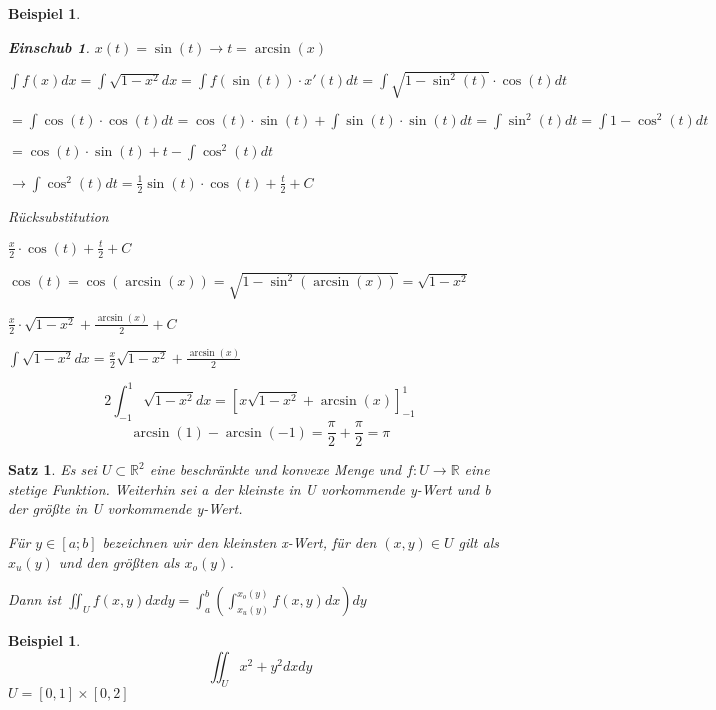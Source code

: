 \documentclass[12pt,a4paper]{scrreprt}
\newtheorem{beispiel}[defi]{Beispiel}
\newtheorem{satz}[defi]{Satz}
\newtheorem*{einschub}{Einschub}
\begin{document}
\begin{beispiel}
\begin{enumerate}[label=\emph{(\roman*)}]
\begin{einschub}
			$x(t)=\sin(t) \to t=\arcsin(x)$

			$\int f(x)dx=\int \sqrt{1-x^2}dx=\int f(\sin(t))\cdot x'(t)dt=\int \sqrt{1-\sin^2(t)}\cdot\cos(t)dt$

			$=\int \cos(t)\cdot\cos(t)dt=\cos(t)\cdot\sin(t)+\int \sin(t)\cdot\sin(t)dt=\int \sin^2(t)dt=\int 1-\cos^2(t)dt$

			$=\cos(t)\cdot\sin(t)+t-\int \cos^2(t)dt$

			$\to \int \cos^2(t)dt=\frac{1}{2}\sin(t)\cdot\cos(t)+\frac{t}{2}+C$

			Rücksubstitution

			$\frac{x}{2}\cdot\cos(t)+\frac{t}{2}+C$

			$\cos(t)=\cos(\arcsin(x))=\sqrt{1-\sin^2(\arcsin(x))}=\sqrt{1-x^2}$

			$\frac{x}{2}\cdot\sqrt{1-x^2}+\frac{\arcsin(x)}{2}+C$

			$\int \sqrt{1-x^2}dx=\frac{x}{2}\sqrt{1-x^2}+\frac{\arcsin(x)}{2}$
		\end{einschub}
		\[2\int_{-1}^1 \sqrt{1-x^2}dx=\left[x\sqrt{1-x^2}+\arcsin(x)\right]^1_{-1}\]
		\[\arcsin(1)-\arcsin(-1)=\frac{\pi}{2}+\frac{\pi}{2}=\pi\]
		\end{enumerate}
	\end{beispiel}

	\begin{satz}
		Es sei $U\subset\mathbb{R}^2$ eine beschränkte und konvexe Menge und $f:U\to\mathbb{R}$ eine stetige Funktion. Weiterhin sei a der kleinste in U vorkommende y-Wert und b der größte in U vorkommende y-Wert.

		Für $y\in[a;b]$ bezeichnen wir den kleinsten x-Wert, für den $(x,y)\in U$ gilt als $x_u(y)$ und den größten als $x_o(y)$.

		Dann ist $\iint_U f(x,y)dxdy=\int_a^b \left(\int_{x_u(y)}^{x_o(y)} f(x,y)dx\right)dy$
	\end{satz}

	\begin{beispiel}
		\[\iint_U x^2+y^2dxdy\] $U=\left[0,1\right]\times\left[0,2\right]$

	\end{beispiel}
\end{document}
